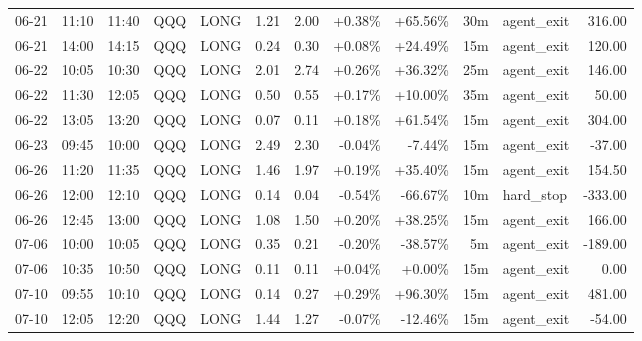 \documentclass[11pt,a4paper]{article}
\begin{document}
\begin{center}
\begin{longtable}{>{\color{txtmain}}l l l l l r r r r r >{\color{txtmain}}l r}
06-21 & 11:10 & 11:40 & QQQ & LONG & 1.21 & 2.00 & \textcolor{wingreen}{+0.38\%} & \textcolor{wingreen}{+65.56\%} & 30m & agent\_exit & \textcolor{wingreen}{316.00} \\
06-21 & 14:00 & 14:15 & QQQ & LONG & 0.24 & 0.30 & \textcolor{wingreen}{+0.08\%} & \textcolor{wingreen}{+24.49\%} & 15m & agent\_exit & \textcolor{wingreen}{120.00} \\
06-22 & 10:05 & 10:30 & QQQ & LONG & 2.01 & 2.74 & \textcolor{wingreen}{+0.26\%} & \textcolor{wingreen}{+36.32\%} & 25m & agent\_exit & \textcolor{wingreen}{146.00} \\
06-22 & 11:30 & 12:05 & QQQ & LONG & 0.50 & 0.55 & \textcolor{wingreen}{+0.17\%} & \textcolor{wingreen}{+10.00\%} & 35m & agent\_exit & \textcolor{wingreen}{50.00} \\
06-22 & 13:05 & 13:20 & QQQ & LONG & 0.07 & 0.11 & \textcolor{wingreen}{+0.18\%} & \textcolor{wingreen}{+61.54\%} & 15m & agent\_exit & \textcolor{wingreen}{304.00} \\
06-23 & 09:45 & 10:00 & QQQ & LONG & 2.49 & 2.30 & \textcolor{lossred}{-0.04\%} & \textcolor{lossred}{-7.44\%} & 15m & agent\_exit & \textcolor{lossred}{-37.00} \\
06-26 & 11:20 & 11:35 & QQQ & LONG & 1.46 & 1.97 & \textcolor{wingreen}{+0.19\%} & \textcolor{wingreen}{+35.40\%} & 15m & agent\_exit & \textcolor{wingreen}{154.50} \\
06-26 & 12:00 & 12:10 & QQQ & LONG & 0.14 & 0.04 & \textcolor{lossred}{-0.54\%} & \textcolor{lossred}{-66.67\%} & 10m & hard\_stop & \textcolor{lossred}{-333.00} \\
06-26 & 12:45 & 13:00 & QQQ & LONG & 1.08 & 1.50 & \textcolor{wingreen}{+0.20\%} & \textcolor{wingreen}{+38.25\%} & 15m & agent\_exit & \textcolor{wingreen}{166.00} \\
07-06 & 10:00 & 10:05 & QQQ & LONG & 0.35 & 0.21 & \textcolor{lossred}{-0.20\%} & \textcolor{lossred}{-38.57\%} & 5m & agent\_exit & \textcolor{lossred}{-189.00} \\
07-06 & 10:35 & 10:50 & QQQ & LONG & 0.11 & 0.11 & \textcolor{wingreen}{+0.04\%} & \textcolor{wingreen}{+0.00\%} & 15m & agent\_exit & \textcolor{wingreen}{0.00} \\
07-10 & 09:55 & 10:10 & QQQ & LONG & 0.14 & 0.27 & \textcolor{wingreen}{+0.29\%} & \textcolor{wingreen}{+96.30\%} & 15m & agent\_exit & \textcolor{wingreen}{481.00} \\
07-10 & 12:05 & 12:20 & QQQ & LONG & 1.44 & 1.27 & \textcolor{lossred}{-0.07\%} & \textcolor{lossred}{-12.46\%} & 15m & agent\_exit & \textcolor{lossred}{-54.00} \\

\end{longtable}
\end{center}
\end{document}
